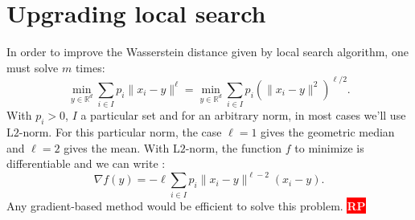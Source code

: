 \documentclass{amsart}
\newcommand{\nb}[3]{
		{\colorbox{#2}{\bfseries\sffamily\tiny\textcolor{white}{#1}}}
		{\textcolor{#2}{\text{$\blacktriangleright$}{\textcolor{#2}{#3}}\text{$\blacktriangleleft$}}}}
\newcommand{\rp}[1]{\nb{RP}{red}{#1}}
\newcommand{\RR}{\mathbb{R}}
\begin{document}
\section{Upgrading local search}\label{L_p optim}
In order to improve the Wasserstein distance given by local search algorithm, one must solve $m$ times: 
$$
\min_{y\in\RR^d}\sum_{i\in I}p_i\lVert x_i-y\rVert^\ell=\min_{y\in\RR^d}\sum_{i\in I}p_i\left(\lVert x_i-y\rVert^2\right)^{\ell/2}.
$$
With $p_i>0$, $I$ a particular set and for an arbitrary norm, in most cases we'll use $\text{L}2$-norm. For this particular norm, the case $\ell=1$ gives the geometric median and $\ell=2$ gives the mean. With L$2$-norm, the function $f$ to minimize is differentiable and we can write : 
$$
\nabla f\left(y\right)=-\ell\sum_{i\in I}p_i\lVert x_i-y\rVert^{\ell-2}\left(x_i-y\right).
$$
Any gradient-based method would be efficient to solve this problem. \rp{can be interesting to study more but hard to find references}


\end{document}
